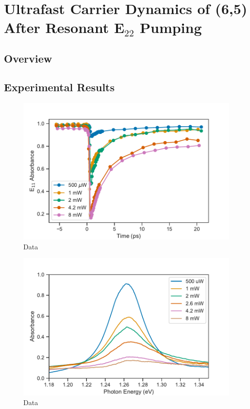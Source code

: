 \chapter{Ultrafast Carrier Dynamics of (6,5) After Resonant E$_{22}$ Pumping}

\section{Overview}

\section{Experimental Results}

\begin{figure}[H]
	\centering
	\includegraphics[scale=0.75]{images/chapter_my_data/absorbance_dynamics_E11}
	\caption{Data}
\end{figure}

\begin{figure}[H]
	\centering
	\includegraphics[scale=0.75]{images/chapter_my_data/peak_abs_vs_pump}
	\caption{Data}
\end{figure}

